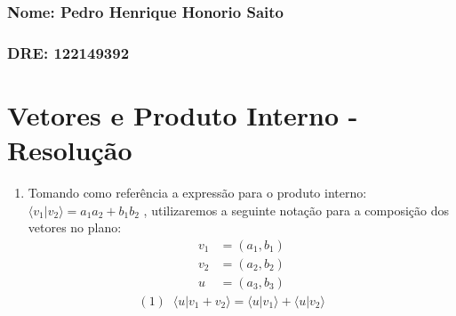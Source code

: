 \documentclass[
]{article}
\author{}
\date{2023-08-19}
\providecommand{\tightlist}{%
  \setlength{\itemsep}{0pt}\setlength{\parskip}{0pt}}
\begin{document}
\hypertarget{nome-pedro-henrique-honorio-saito}{%
\subsubsection{Nome: Pedro Henrique Honorio
Saito}\label{nome-pedro-henrique-honorio-saito}}

\hypertarget{dre-122149392}{%
\subsubsection{DRE: 122149392}\label{dre-122149392}}

\hypertarget{vetores-e-produto-interno---resoluuxe7uxe3o}{%
\section{Vetores e Produto Interno -
Resolução}\label{vetores-e-produto-interno---resoluuxe7uxe3o}}

\begin{enumerate}
\def\labelenumi{\arabic{enumi}.}
\tightlist
\item
  Tomando como referência a expressão para o produto interno:
  \(\langle v_1|v_2\rangle=a_1a_2+b_1b_2\) , utilizaremos a seguinte
  notação para a composição dos vetores no plano: \[
  \begin{flalign*}
  v_1&=(a_1,b_1) \\
  v_2&=(a_2,b_2) \\
  u&=(a_3,b_3)
  \end{flalign*}\] \[
  \begin{flalign*}
  (1)\;\;\langle u|v_1+v_2\rangle=\langle u|v_1\rangle+\langle u|v_2\rangle&& \\
  \end{flalign*}
  \]
\end{enumerate}
\end{document}
